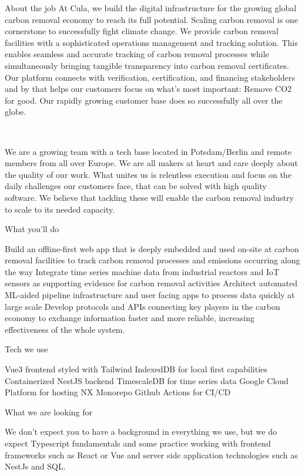 About the job
At Cula, we build the digital infrastructure for the growing global carbon removal economy to reach its full potential. Scaling carbon removal is one cornerstone to successfully fight climate change. We provide carbon removal facilities with a sophisticated operations management and tracking solution. This enables seamless and accurate tracking of carbon removal processes while simultaneously bringing tangible transparency into carbon removal certificates. Our platform connects with verification, certification, and financing stakeholders and by that helps our customers focus on what's most important: Remove CO2 for good. Our rapidly growing customer base does so successfully all over the globe.

‍

We are a growing team with a tech base located in Potsdam/Berlin and remote members from all over Europe. We are all makers at heart and care deeply about the quality of our work. What unites us is relentless execution and focus on the daily challenges our customers face, that can be solved with high quality software. We believe that tackling these will enable the carbon removal industry to scale to its needed capacity.



What you'll do



Build an offline-first web app that is deeply embedded and used on-site at carbon removal facilities to track carbon removal processes and emissions occurring along the way
Integrate time series machine data from industrial reactors and IoT sensors as supporting evidence for carbon removal activities
Architect automated ML-aided pipeline infrastructure and user facing apps to process data quickly at large scale
Develop protocols and APIs connecting key players in the carbon economy to exchange information faster and more reliable, increasing effectiveness of the whole system.
‍

Tech we use



Vue3 frontend styled with Tailwind
IndexedDB for local first capabilities
Containerized NestJS backend
TimescaleDB for time series data
Google Cloud Platform for hosting
NX Monorepo 
Github Actions for CI/CD
‍

What we are looking for



We don’t expect you to have a background in everything we use, but we do expect Typescript fundamentals and some practice working with frontend frameworks such as React or Vue and server side application technologies such as NestJs and SQL. 

